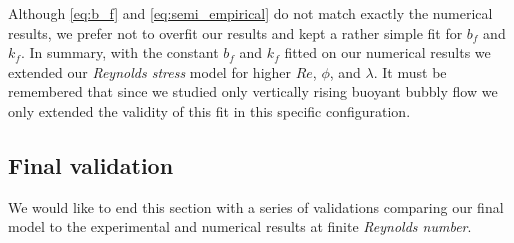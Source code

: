 

Although \ref{eq:b_f} and \ref{eq:semi_empirical} do not match exactly the numerical results, we prefer not to overfit our results and kept a rather simple fit for $b_f$ and $k_f$. 
In summary, with the constant $b_f$ and $k_f$ fitted on our numerical results we extended our \textit{Reynolds stress} model for higher $Re$, $\phi$, and $\lambda$. 
It must be remembered that since we studied only vertically rising buoyant bubbly flow we only extended the validity of this fit in this specific configuration. 



\subsection{Final validation}

We would like to end this section with a series of validations comparing our final model to the experimental and numerical results at finite \textit{Reynolds number}. 

